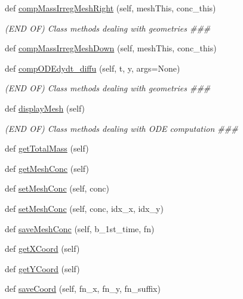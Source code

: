 \begin{DoxyCompactItemize}
\item 
def \hyperlink{classcomp_1_1Comp_a0f93a3308637381e7342a2a7497d174d}{comp\+Mass\+Irreg\+Mesh\+Right} (self, mesh\+This, conc\+\_\+this)
\begin{DoxyCompactList}\small\item\em (E\+ND OF) Class methods dealing with geometries \#\#\# \end{DoxyCompactList}\item 
def \hyperlink{classcomp_1_1Comp_a7b78ad68606fdf55c38c3de6d5a67570}{comp\+Mass\+Irreg\+Mesh\+Down} (self, mesh\+This, conc\+\_\+this)
\item 
def \hyperlink{classcomp_1_1Comp_af33e252fda921dadb0e80c825e48e386}{comp\+O\+D\+Edydt\+\_\+diffu} (self, t, y, args=None)
\begin{DoxyCompactList}\small\item\em (E\+ND OF) Class methods dealing with geometries \#\#\# \end{DoxyCompactList}\item 
def \hyperlink{classcomp_1_1Comp_ad2c0555c16dc7b5bf639407fa44bfaf7}{display\+Mesh} (self)
\begin{DoxyCompactList}\small\item\em (E\+ND OF) Class methods dealing with O\+DE computation \#\#\# \end{DoxyCompactList}\item 
def \hyperlink{classcomp_1_1Comp_a7b8cd6483a2de95d92a0d5b4d939ca65}{get\+Total\+Mass} (self)
\item 
def \hyperlink{classcomp_1_1Comp_ac100eb9f8d55df5f9f761cbe45a58024}{get\+Mesh\+Conc} (self)
\item 
def \hyperlink{classcomp_1_1Comp_afa8ff8a057f1c9ee1ddd027b08a3160c}{set\+Mesh\+Conc} (self, conc)
\item 
def \hyperlink{classcomp_1_1Comp_ad6b532a1d5c1aa95b9a88124a5b5609d}{set\+Mesh\+Conc} (self, conc, idx\+\_\+x, idx\+\_\+y)
\item 
def \hyperlink{classcomp_1_1Comp_afe675826a85b99ab6dc5de7ed02a2e0d}{save\+Mesh\+Conc} (self, b\+\_\+1st\+\_\+time, fn)
\item 
def \hyperlink{classcomp_1_1Comp_a61ca5ccfbb7e0ee1244931e78eb5a35d}{get\+X\+Coord} (self)
\item 
def \hyperlink{classcomp_1_1Comp_ab61436b8f65a7f8c45fb554e412cdfa3}{get\+Y\+Coord} (self)
\item 
def \hyperlink{classcomp_1_1Comp_a0268c9629d4839526c1e81114adc2408}{save\+Coord} (self, fn\+\_\+x, fn\+\_\+y, fn\+\_\+suffix)
\end{DoxyCompactItemize}
